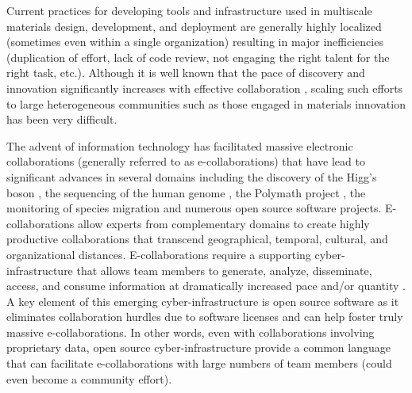 \documentclass{bmcart}
\begin{document}
Current practices for developing tools and infrastructure used in multiscale materials design, development, and deployment are generally highly localized (sometimes even within a single organization) resulting in major inefficiencies (duplication of effort, lack of code review, not engaging the right talent for the right task, etc.). Although it is well known that the pace of discovery and innovation  significantly increases with effective collaboration \cite{sawhney2005collaborating, edwards2009open, bayne2008interdisciplinary, boudreau2010open}, scaling such efforts to large heterogeneous communities such as those engaged in materials innovation has been very difficult.

The advent of information technology has facilitated massive electronic collaborations (generally referred to as e-collaborations) that have lead to significant advances in several domains including the discovery of the Higg's boson \cite{aad2012observation}, the sequencing of the human genome \cite{lander2001initial}, the Polymath project \cite{cranshaw2011polymath}, the monitoring of species migration \cite{dickinson2010citizen, hochachka2012data} and numerous open source software projects. E-collaborations allow experts from complementary domains to create highly productive collaborations that transcend geographical, temporal, cultural, and organizational distances. E-collaborations require a supporting cyber-infrastructure that allows team members to generate, analyze, disseminate, access, and consume information at dramatically increased pace and/or quantity \cite{atkins2003revolutionizing}. A key element of this emerging cyber-infrastructure is open source software as it eliminates collaboration hurdles due to software licenses and can help foster truly massive e-collaborations. In other words, even with collaborations involving proprietary data, open source cyber-infrastructure provide a common language that can facilitate e-collaborations with large numbers of team members (could even become a community effort).
\end{document}
